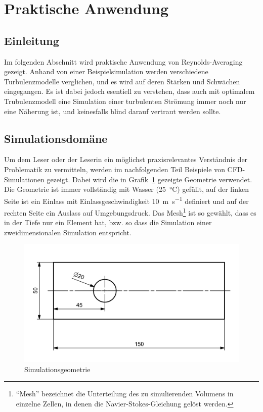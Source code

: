 %
%
\section{Praktische Anwendung}
%

\subsection{Einleitung}

Im folgenden Abschnitt wird praktische Anwendung von Reynolds-Averaging gezeigt.
%
Anhand von einer Beispielsimulation werden verschiedene Turbulenzmodelle verglichen, und es wird auf deren Stärken und Schwächen eingegangen.
Es ist dabei jedoch esentiell zu verstehen, dass auch mit optimalem Trubulenzmodell eine Simulation einer turbulenten Strömung immer noch nur eine Näherung ist,
und keinesfalls blind darauf vertraut werden sollte.

\subsection{Simulationsdomäne}
\label{subsubsec:domain-desc}

Um dem Leser oder der Leserin ein möglichst praxisrelevantes Verständnis der Problematik zu vermitteln, werden
im nachfolgenden Teil Beispiele von CFD-Simulationen gezeigt.
Dabei wird die in Grafik~\ref{fig:SimDomain} gezeigte Geometrie verwendet.
Die Geometrie ist immer vollständig mit Wasser (\SI{25}{\degreeCelsius}) gefüllt,
auf der linken Seite ist ein Einlass mit Einlassgeschwindigkeit \SI{10}{\meter\per\second} definiert und
auf der rechten Seite ein Auslass auf Umgebungsdruck.
Das Mesh\footnote{``Mesh'' bezeichnet die Unterteilung des zu simulierenden Volumens in einzelne Zellen,
in denen die Navier-Stokes-Gleichung gelöst werden.} ist so gewählt, dass es in der Tiefe nur ein Element hat,
bzw. so dass die Simulation einer zweidimensionalen Simulation entspricht.

\begin{figure}
    \includegraphics[width=\textwidth]{papers/reynolds/images/domain.png}
    \caption{Simulationsgeometrie}
    \label{fig:SimDomain}
\end{figure}

